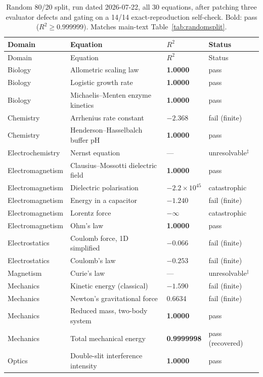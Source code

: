 \documentclass[11pt]{article}
\newcommand{\rtwo}{$R^2$}
\begin{document}
\begin{longtable}{p{2.3cm}p{6.2cm}p{1.5cm}p{2.5cm}}
\caption{Random 80/20 split, run dated 2026-07-22, all 30 equations, after
patching three evaluator defects and gating on a 14/14 exact-reproduction
self-check. Bold: pass ($R^2 \geq 0.999999$). Matches main-text
Table~\ref{tab:randomsplit}.}
\label{supp:tab:randomsplit}\\
\toprule
Domain & Equation & \rtwo & Status \\
\midrule
\endfirsthead
\toprule
Domain & Equation & \rtwo & Status \\
\midrule
\endhead
Biology & Allometric scaling law & \textbf{1.0000} & pass \\
Biology & Logistic growth rate & \textbf{1.0000} & pass \\
Biology & Michaelis--Menten enzyme kinetics & \textbf{1.0000} & pass \\
Chemistry & Arrhenius rate constant & $-2.368$ & fail (finite) \\
Chemistry & Henderson--Hasselbalch buffer pH & \textbf{1.0000} & pass \\
Electrochemistry & Nernst equation & --- & unresolvable$^\ddagger$ \\
Electromagnetism & Clausius--Mossotti dielectric field & \textbf{1.0000} & pass \\
Electromagnetism & Dielectric polarisation & $-2.2\times10^{45}$ & catastrophic \\
Electromagnetism & Energy in a capacitor & $-1.240$ & fail (finite) \\
Electromagnetism & Lorentz force & $-\infty$ & catastrophic \\
Electromagnetism & Ohm's law & \textbf{1.0000} & pass \\
Electrostatics & Coulomb force, 1D simplified & $-0.066$ & fail (finite) \\
Electrostatics & Coulomb's law & $-0.253$ & fail (finite) \\
Magnetism & Curie's law & --- & unresolvable$^\ddagger$ \\
Mechanics & Kinetic energy (classical) & $-1.590$ & fail (finite) \\
Mechanics & Newton's gravitational force & 0.6634 & fail (finite) \\
Mechanics & Reduced mass, two-body system & \textbf{1.0000} & pass \\
Mechanics & Total mechanical energy & \textbf{0.9999998} & pass (recovered) \\
Optics & Double-slit interference intensity & \textbf{1.0000} & pass \\

\end{longtable}
\end{document}
